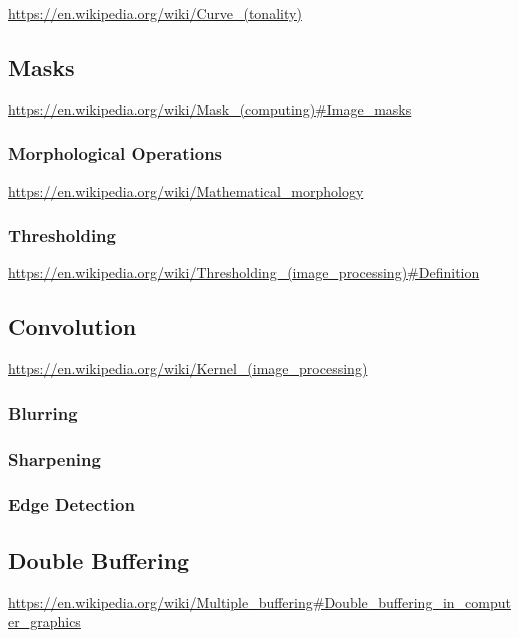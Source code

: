 \url{https://en.wikipedia.org/wiki/Curve_(tonality)}

\subsection{Masks}

\url{https://en.wikipedia.org/wiki/Mask_(computing)#Image_masks}

\subsubsection{Morphological Operations}

\url{https://en.wikipedia.org/wiki/Mathematical_morphology}

\subsubsection{Thresholding}

\url{https://en.wikipedia.org/wiki/Thresholding_(image_processing)#Definition}

\subsection{Convolution}

\url{https://en.wikipedia.org/wiki/Kernel_(image_processing)}

\subsubsection{Blurring}

\subsubsection{Sharpening}

\subsubsection{Edge Detection}

\subsection{Double Buffering}

\url{https://en.wikipedia.org/wiki/Multiple_buffering#Double_buffering_in_computer_graphics}

